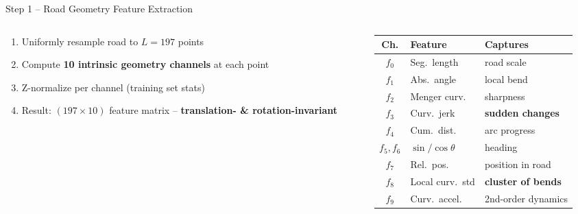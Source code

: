 \documentclass[aspectratio=169,10pt]{beamer}
\newcommand{\hl}[1]{\textcolor{mLightBrown}{\textbf{#1}}}
\begin{document}
\begin{frame}{Step 1 -- Road Geometry Feature Extraction}
  \begin{columns}[T]
    \begin{column}{0.50\linewidth}
      \begin{enumerate}
        \item Uniformly resample road to $L{=}197$ points
        \item Compute \textbf{10 intrinsic geometry channels} at each point
        \item Z-normalize per channel (training set stats)
        \item Result: $(197{\times}10)$ feature matrix -- \textbf{translation- \& rotation-invariant}
      \end{enumerate}
    \end{column}
    \begin{column}{0.47\linewidth}
      \small
      \begin{tabular}{@{}clp{2.3cm}@{}}
        \toprule
        \textbf{Ch.} & \textbf{Feature} & \textbf{Captures} \\
        \midrule
        $f_0$ & Seg.\ length    & road scale \\
        $f_1$ & Abs.\ angle     & local bend \\
        $f_2$ & Menger curv.    & sharpness \\
        $f_3$ & Curv.\ jerk     & \hl{sudden changes} \\
        $f_4$ & Cum.\ dist.     & arc progress \\
        $f_5,f_6$ & $\sin/\cos\theta$ & heading \\
        $f_7$ & Rel.\ pos.      & position in road \\
        $f_8$ & Local curv.\ std & \hl{cluster of bends} \\
        $f_9$ & Curv.\ accel.   & 2nd-order dynamics \\
        \bottomrule
      \end{tabular}
    \end{column}
  \end{columns}
\end{frame}
\end{document}
